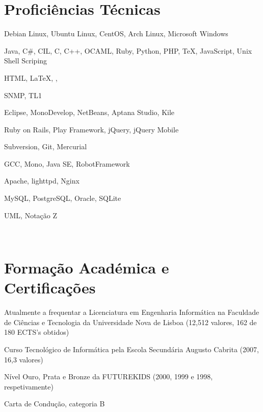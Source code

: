 \documentclass[a4paper,fontsize=10pt]{scrartcl} %
\begin{document}
\begin{minipage}[t]{0.46\textwidth} %

\vspace{0pt} %
	
\section{Proficiências Técnicas}
\begin{inparaitem}
\item[] Debian Linux, Ubuntu Linux, CentOS, Arch Linux,  Microsoft Windows
\item Java, C\#, CIL, C, C++, OCAML, Ruby, Python, PHP, \TeX, JavaScript, Unix Shell Scriping
\item HTML, \LaTeX, \XeTeX, \XeLaTeX\
\item SNMP, TL1
\item Eclipse, MonoDevelop, NetBeans, Aptana Studio, Kile
\item Ruby on Rails, Play Framework, jQuery, jQuery Mobile
\item Subversion, Git, Mercurial
\item GCC, Mono, Java SE, RobotFramework 
\item Apache, lighttpd, Nginx
\item MySQL, PostgreSQL, Oracle, SQLite
\item UML, Nota\c{c}ão Z
\end{inparaitem}\\\par
\section{Forma\c{c}ão Académica e Certifica\c{c}ões}
\begin{inparaitem}
\item[] Atualmente a frequentar a Licenciatura em Engenharia Informática na Faculdade de Ciências e Tecnologia da Universidade Nova de Lisboa (12,512 valores, 162 de 180 ECTS's obtidos)
\item Curso Tecnológico de Informática pela Escola Secundária Augusto Cabrita (2007, 16,3 valores)
\item Nível Ouro, Prata e Bronze da FUTUREKIDS (2000, 1999 e 1998, respetivamente)
\item Carta de Condu\c{c}ão, categoria B
\end{inparaitem}
\\\par

\end{minipage}
\end{document}
